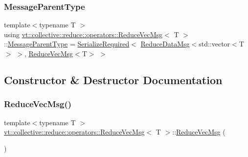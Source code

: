 \mbox{\label{structvt_1_1collective_1_1reduce_1_1operators_1_1_reduce_vec_msg_a6b8e1bc57ff143c8e7e2b90b8f9059b3}} 
\subsubsection{\texorpdfstring{Message\+Parent\+Type}{MessageParentType}}
{\footnotesize\ttfamily template$<$typename T $>$ \\
using \hyperlink{structvt_1_1collective_1_1reduce_1_1operators_1_1_reduce_vec_msg}{vt\+::collective\+::reduce\+::operators\+::\+Reduce\+Vec\+Msg}$<$ T $>$\+::\hyperlink{structvt_1_1collective_1_1reduce_1_1operators_1_1_reduce_vec_msg_a6b8e1bc57ff143c8e7e2b90b8f9059b3}{Message\+Parent\+Type} =  \hyperlink{namespacevt_a9e60e2e8929828639383ac1d6643384d}{Serialize\+Required}$<$ \hyperlink{structvt_1_1collective_1_1reduce_1_1operators_1_1_reduce_data_msg}{Reduce\+Data\+Msg}$<$std\+::vector$<$T$>$ $>$, \hyperlink{structvt_1_1collective_1_1reduce_1_1operators_1_1_reduce_vec_msg}{Reduce\+Vec\+Msg}$<$T$>$ $>$}



\subsection{Constructor \& Destructor Documentation}
\mbox{\label{structvt_1_1collective_1_1reduce_1_1operators_1_1_reduce_vec_msg_a3e167018ff1d8a0a4bf85843705b737d}} 
\subsubsection{\texorpdfstring{Reduce\+Vec\+Msg()}{ReduceVecMsg()}\hspace{0.1cm}{\footnotesize\ttfamily [1/3]}}
{\footnotesize\ttfamily template$<$typename T $>$ \\
\hyperlink{structvt_1_1collective_1_1reduce_1_1operators_1_1_reduce_vec_msg}{vt\+::collective\+::reduce\+::operators\+::\+Reduce\+Vec\+Msg}$<$ T $>$\+::\hyperlink{structvt_1_1collective_1_1reduce_1_1operators_1_1_reduce_vec_msg}{Reduce\+Vec\+Msg} (\begin{DoxyParamCaption}{ }\end{DoxyParamCaption})\hspace{0.3cm}{\ttfamily [default]}}

